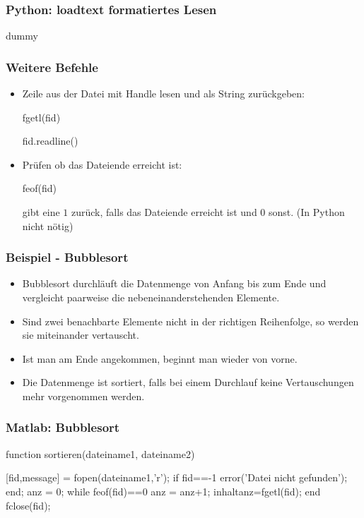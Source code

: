\documentclass[hyperref={xetex}]{beamer}
\begin{document}
%
%
\begin{frame}[fragile]\frametitle{Python: loadtext formatiertes Lesen}
  dummy
\end{frame}
%
%
\begin{frame}[fragile]\frametitle{Weitere Befehle}
\begin{itemize}
\item Zeile aus der Datei mit  Handle  lesen und als String zurückgeben:
\begin{matlabin}
fgetl(fid) 
\end{matlabin}
  \begin{pyin}
fid.readline()
  \end{pyin}
\item Prüfen ob das Dateiende erreicht ist:
\begin{matlabin}
feof(fid)
\end{matlabin}
 gibt eine $1$
  zurück, falls das Dateiende erreicht ist und $0$ sonst. (In Python nicht nötig)
\end{itemize}
\end{frame}
%
%
\begin{frame}[fragile]\frametitle{Beispiel - Bubblesort}
\begin{itemize}
\item Bubblesort durchläuft die Datenmenge von Anfang bis zum Ende und
vergleicht paarweise die nebeneinanderstehenden Elemente. 
\item Sind zwei
benachbarte Elemente nicht in der richtigen Reihenfolge, so werden sie
miteinander vertauscht. 
\item Ist man am Ende angekommen, beginnt man wieder
von vorne. 
\item Die Datenmenge ist sortiert, falls bei einem Durchlauf
keine Vertauschungen mehr vorgenommen werden.
\end{itemize} 
\end{frame}
%
%
\begin{frame}[fragile]\frametitle{Matlab: Bubblesort}
\begin{matlabin}
function sortieren(dateiname1, dateiname2)
 
[fid,message] = fopen(dateiname1,'r');
if fid==-1 
    error('Datei nicht gefunden');
end;
anz = 0;
while feof(fid)==0
    anz = anz+1;     
    inhalt{anz}=fgetl(fid); 
end
fclose(fid);
\end{matlabin}
\end{frame}
\end{document}
